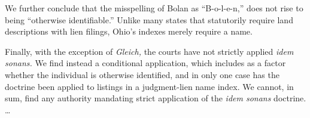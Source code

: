 We further conclude that the misspelling of Bolan as ``B-o-l-e-n,'' does not
rise to being ``otherwise identifiable.'' Unlike many states that statutorily
require land descriptions with lien filings, Ohio's indexes merely require a
name.

Finally, with the exception of \textit{Gleich,} the courts have not strictly
applied \textit{idem sonans.} We find instead a conditional application, which
includes as a factor whether the individual is otherwise identified, and in
only one case has the doctrine been applied to listings in a judgment-lien name
index. We cannot, in sum, find any authority mandating strict application of
the \textit{idem sonans} doctrine. \dots{}


